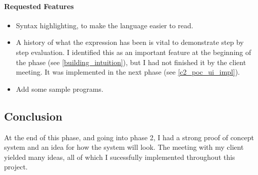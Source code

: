 \paragraph{Requested Features}
\begin{itemize}
    \item Syntax highlighting, to make the language easier to read.
    \item A history of what the expression has been is vital to demonstrate step by step evaluation. I identified this as an important feature at the beginning of the phase (see \ref{building_intuition}), but I had not finished it by the client meeting. It was implemented in the next phase (see \ref{c2_poc_ui_impl}). 
    \item Add some sample programs. 
\end{itemize}

\subsection{Conclusion}
At the end of this phase, and going into phase 2, I had a strong proof of concept system and an idea for how the system will look. The meeting with my client yielded many ideas, all of which I sucessfully implemented throughout this project. 